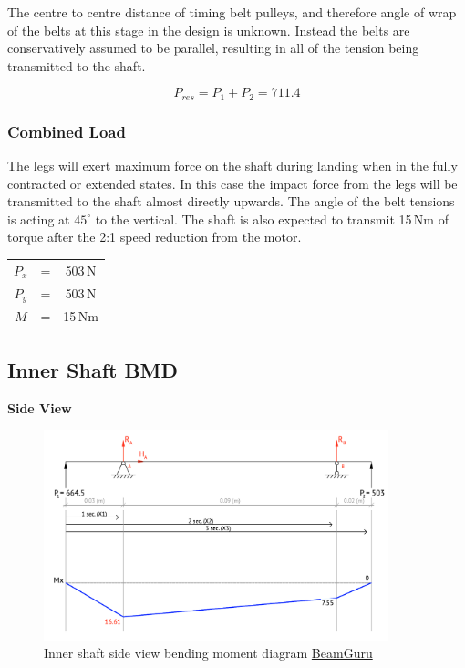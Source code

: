 \documentclass[11pt, titlepage]{article}
\begin{document}
The centre to centre distance of timing belt pulleys, and therefore angle of wrap of the belts at this stage in the design is unknown. Instead the belts are conservatively assumed to be parallel, resulting in all of the tension being transmitted to the shaft.

\begin{equation}
	P_{res} = P_1 + P_2 = 711.4
\end{equation}

\subsubsection{Combined Load}
The legs will exert maximum force on the shaft during landing when in the fully contracted or extended states. In this case the impact force from the legs will be transmitted to the shaft almost directly upwards. The angle of the belt tensions is acting at $45^{\circ}$ to the vertical. The shaft is also expected to transmit 15\,Nm of torque after the 2:1 speed reduction from the motor.
\begin{table}[h!]
\centering
	\begin{tabular}{c c c}
		$P_{x}$ & = & 503\,N \\
		$P_{y}$ & = & 503\,N \\
		$M$ & = & 15\,Nm \\
	\end{tabular}
\end{table}

\newpage
\subsection{Inner Shaft BMD}
\noindent\textbf{Side View}
\begin{figure}[h]
\centering
	\includegraphics[width=10cm]{inner_shaft_side_bmd.png}
	\caption{Inner shaft side view bending moment diagram \href{beamguru.com/online/beam-calculator/?save=e3c807530bc8028842f255e179b1241b}{BeamGuru}}
\end{figure}
\end{document}

